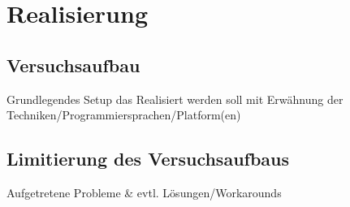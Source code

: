 \chapter{Realisierung}
\section{Versuchsaufbau}
Grundlegendes Setup das Realisiert werden soll mit Erwähnung der Techniken/Programmiersprachen/Platform(en)
\section{Limitierung des Versuchsaufbaus}
Aufgetretene Probleme \& evtl. Lösungen/Workarounds